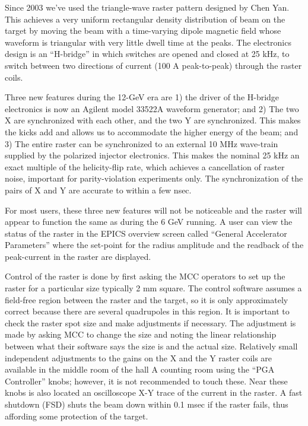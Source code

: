 {{Since 2003 we've used the triangle-wave 
raster pattern designed by Chen Yan.  
This achieves a very uniform rectangular
density distribution of beam on the target 
by moving the beam with a time-varying dipole
magnetic field whose waveform is triangular
with very little dwell time at the peaks.  
The electronics design is an ``H-bridge''
in which switches are opened and closed 
at 25 kHz, to switch between two directions 
of current (100 A peak-to-peak) 
through the raster coils.

Three new features during the 12-GeV era are 
1) the driver of the H-bridge electronics is now
an Agilent model 33522A waveform generator; and
2) The two X are synchronized with each other, and
the two Y are synchronized.  This makes the kicks
add and allows us to accommodate the higher energy
of the beam; and 3) The entire raster can
be synchronized to an external 10 MHz wave-train
supplied by the polarized injector electronics.
This makes the nominal 25 kHz an exact multiple of
the helicity-flip rate, which achieves a cancellation
of raster noise, important for parity-violation 
experiments only.
The synchronization of the pairs of X and Y are
accurate to within a few nsec.

For most users, these three new features will not be
noticeable and the raster will appear to function
the same as during the 6 GeV running.
A user can view the 
status of the raster in the
EPICS overview screen called ``General Accelerator
Parameters'' where the set-point for the radius amplitude
and the readback of the peak-current in the raster are displayed.

Control of the raster is done by first asking the MCC
operators to set up the raster for a particular size
typically 2 mm square.
The control software assumes a field-free region between
the raster and the target, so it is only approximately
correct because there are several quadrupoles in this region.
It is important to check the raster spot size and
make adjustments if necessary.  The adjustment is made
by asking MCC to change the size and noting the 
linear relationship between what their software says
the size is and the actual size.
Relatively small independent adjustments to the 
gains on the X and the Y raster
coils are available in the middle room of the hall A
counting room using the ``PGA Controller'' knobs;
however, it is not recommended to touch these.
Near these knobs is also located an oscilloscope X-Y trace
of the current in the raster.  A fast shutdown (FSD) shuts
the beam down within 0.1 msec if the raster fails, thus
affording some protection of the target.

}}
